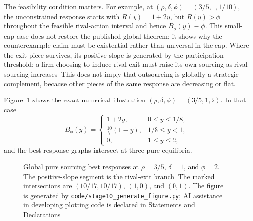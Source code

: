 The feasibility condition matters.  For example, at
\((\rho,\delta,\phi)=(3/5,1,1/10)\), the unconstrained response starts with
\(R(y)=1+2y\), but \(R(y)>\phi\) throughout the feasible rival-action
interval and hence \(B_\phi(y)\equiv\phi\).  This small-cap case does not
restore the published global theorem; it shows why the counterexample claim must
be existential rather than universal in the cap.  Where the exit piece survives,
its positive slope is generated by the participation threshold: a firm choosing
to induce rival exit must raise its own sourcing as rival sourcing increases.
This does not imply that outsourcing is globally a strategic complement, because
other pieces of the same response are decreasing or flat.

Figure~\ref{fig:br-witness} shows the exact numerical illustration \((\rho,\delta,\phi)=(3/5,1,2)\).  In that case
\[
B_\phi(y)=
\begin{cases}
1+2y,&0\le y\le1/8,\\
\frac{10}{7}(1-y),&1/8\le y<1,\\
0,&1\le y\le2,
\end{cases}
\]
and the best-response graphs intersect at three pure equilibria.

\begin{figure}[t]
\centering

\caption{Global pure sourcing best responses at \(\rho=3/5\), \(\delta=1\), and \(\phi=2\).  The positive-slope segment is the rival-exit branch.  The marked intersections are \((10/17,10/17)\), \((1,0)\), and \((0,1)\).  The figure is generated by \texttt{code/stage10\_generate\_figure.py}; AI assistance in developing plotting code is declared in Statements and Declarations}
\label{fig:br-witness}
\end{figure}
